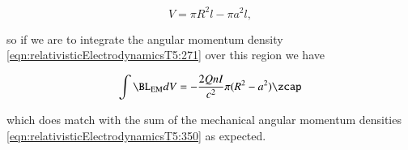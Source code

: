 \begin{equation}\label{eqn:relativisticElectrodynamicsT5:351}
V = \pi R^2 l - \pi a^2 l,
\end{equation}

so if we are to integrate the angular momentum density \ref{eqn:relativisticElectrodynamicsT5:271} over this region we have

\begin{equation}\label{eqn:relativisticElectrodynamicsT5:271b}
\int \BL_{\text{EM}} dV = -\frac{2 Q n I}{c^2} \pi (R^2 - a^2) \zcap
\end{equation}

which does match with the sum of the mechanical angular momentum densities \ref{eqn:relativisticElectrodynamicsT5:350} as expected.

\EndArticle
